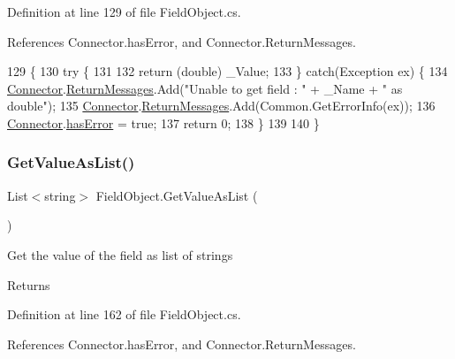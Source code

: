 Definition at line 129 of file Field\+Object.\+cs.



References Connector.\+has\+Error, and Connector.\+Return\+Messages.


\begin{DoxyCode}
129                                      \{
130         \textcolor{keywordflow}{try} \{
131 
132             \textcolor{keywordflow}{return} (\textcolor{keywordtype}{double}) \_Value;
133         \} \textcolor{keywordflow}{catch}(Exception ex) \{
134             \hyperlink{class_connector}{Connector}.\hyperlink{class_connector_a1ed422674b344524fd77998dcf6a9ba6}{ReturnMessages}.Add(\textcolor{stringliteral}{"Unable to get field : "} + \_Name + \textcolor{stringliteral}{" as
       double"});
135             \hyperlink{class_connector}{Connector}.\hyperlink{class_connector_a1ed422674b344524fd77998dcf6a9ba6}{ReturnMessages}.Add(Common.GetErrorInfo(ex));
136             \hyperlink{class_connector}{Connector}.\hyperlink{class_connector_a079bae21a5417efa53bfe8954c0f533f}{hasError} = \textcolor{keyword}{true};
137             \textcolor{keywordflow}{return} 0;
138         \}
139        
140     \}
\end{DoxyCode}
\mbox{\label{class_field_object_a635d7598cbf7bbc29821cb1c012de964}} 
\subsubsection{\texorpdfstring{Get\+Value\+As\+List()}{GetValueAsList()}}
{\footnotesize\ttfamily List$<$string$>$ Field\+Object.\+Get\+Value\+As\+List (\begin{DoxyParamCaption}{ }\end{DoxyParamCaption})}



Get the value of the field as list of strings 

\begin{DoxyReturn}{Returns}

\end{DoxyReturn}


Definition at line 162 of file Field\+Object.\+cs.



References Connector.\+has\+Error, and Connector.\+Return\+Messages.


